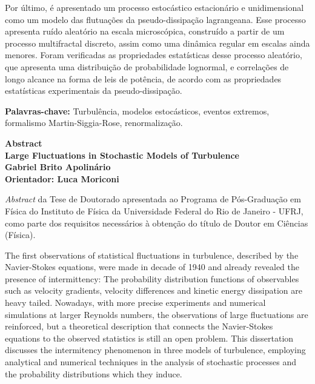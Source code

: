 \documentclass[brazil,12pt,a4paper,openany]{book}
\begin{document}
Por último, é apresentado um processo estocástico estacionário e unidimensional como um modelo das flutuações da pseudo-dissipação lagrangeana. Esse processo apresenta ruído aleatório na escala microscópica, construído a partir de um processo multifractal discreto, assim como uma dinâmica regular em escalas ainda menores. Foram verificadas as propriedades estatísticas desse processo aleatório, que apresenta uma distribuição de probabilidade lognormal, e correlações de longo alcance na forma de leis de potência, de acordo com as propriedades estatísticas experimentais da pseudo-dissipação.

\vspace{15pt}

\textbf{Palavras-chave:} Turbulência, modelos estocásticos, eventos extremos, formalismo Martin-Sig\-gia-Ro\-se, renormalização.


\newpage

\noindent

\vspace*{20pt}
\begin{center}
{\LARGE\bf Abstract}\\
\vspace{15pt}
{\Large\bf Large Fluctuations in Stochastic Models of Turbulence}\\
\vspace{6pt}
{\bf Gabriel Brito Apolinário}\\
\vspace{12pt}
{\bf Orientador: Luca Moriconi}\\
\vspace{20pt}
\parbox{14cm}{\emph{Abstract} da Tese de Doutorado apresentada ao Programa de Pós-Graduação em Física do Instituto de Física da Universidade Federal do Rio de Janeiro - UFRJ, como parte dos requisitos necessários à obtenção do título de Doutor em Ciências (Física).}
\end{center}
\vspace*{35pt}

The first observations of statistical fluctuations in turbulence, described by the Navier-Stokes equations, were made in decade of 1940 and already revealed the presence of intermittency: The probability distribution functions of observables such as velocity gradients, velocity differences and kinetic energy dissipation are heavy tailed. Nowadays, with more precise experiments and numerical simulations at larger Reynolds numbers, the observations of large fluctuations are reinforced, but a theoretical description that connects the Navier-Stokes equations to the observed statistics is still an open problem. This dissertation discusses the intermitency phenomenon in three models of turbulence, employing analytical and numerical techniques in the analysis of stochastic processes and the probability distributions which they induce.
\end{document}
